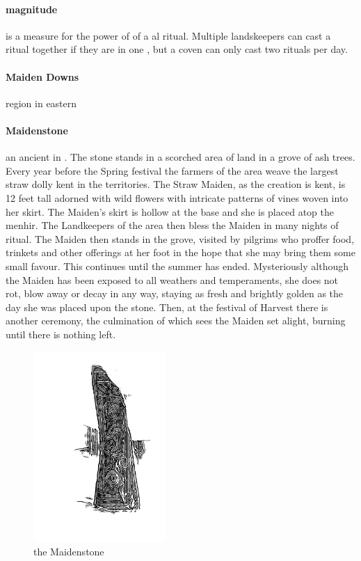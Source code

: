 \paragraph{magnitude} is a measure for the power of of a al ritual. Multiple landskeepers can cast a ritual together if they are in one , but a coven can only cast two rituals per day.
\paragraph{Maiden Downs} region in eastern 
\paragraph{Maidenstone} an ancient  in . The stone stands in a scorched area of land in a grove of ash trees. Every year before the Spring festival the farmers of the area weave the largest straw dolly kent in the territories. The Straw Maiden, as the creation is kent, is 12 feet tall adorned with wild flowers with intricate patterns of vines woven into her skirt. The Maiden’s skirt is hollow at the base and she is placed atop the menhir. The Landkeepers of the area then bless the Maiden in many nights of ritual. The Maiden then stands in the grove, visited by pilgrims who proffer food, trinkets and other offerings at her foot in the hope that she may bring them some small favour. This continues until the summer has ended. Mysteriously although the Maiden has been exposed to all weathers and temperaments, she does not rot, blow away or decay in any way, staying as fresh and brightly golden as the day she was placed upon the stone. Then, at the festival of Harvest there is another ceremony, the culmination of which sees the Maiden set alight, burning until there is nothing left. \begin{figure} \centering \includegraphics[width=5cm]{encyclopedia/Maidenstone} \caption{the Maidenstone}\end{figure}
